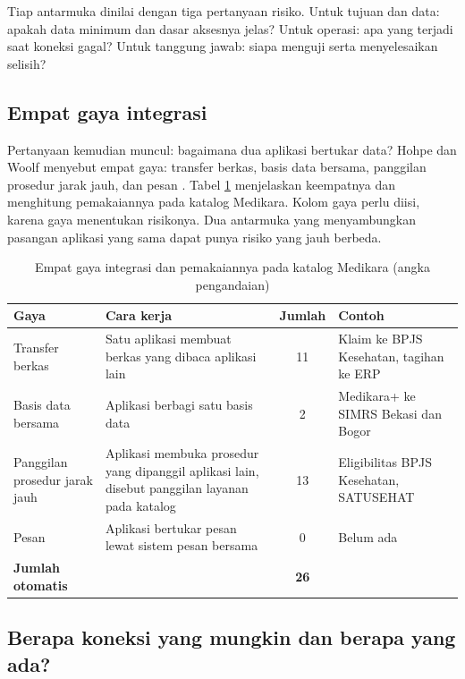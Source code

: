 Tiap antarmuka dinilai dengan tiga pertanyaan risiko. Untuk tujuan dan data: apakah data minimum dan dasar
aksesnya jelas? Untuk operasi: apa yang terjadi saat koneksi gagal? Untuk tanggung jawab: siapa menguji serta
menyelesaikan selisih?

\subsection*{Empat gaya integrasi}

Pertanyaan kemudian muncul: bagaimana dua aplikasi bertukar data? Hohpe dan Woolf menyebut empat gaya:
transfer berkas, basis data bersama, panggilan prosedur jarak jauh, dan pesan \cite{hohpe2003}. Tabel
\ref{tab:ch07-gaya} menjelaskan keempatnya dan menghitung pemakaiannya pada katalog Medikara. Kolom gaya
perlu diisi, karena gaya menentukan risikonya. Dua antarmuka yang menyambungkan pasangan aplikasi yang
sama dapat punya risiko yang jauh berbeda.

\begin{table}[!htb]
  \centering
  \caption{Empat gaya integrasi dan pemakaiannya pada katalog Medikara (angka pengandaian)}
  \label{tab:ch07-gaya}
  \small
  \begin{tabularx}{\textwidth}{>{\raggedright\arraybackslash}p{2.5cm}>{\raggedright\arraybackslash}Xc>{\raggedright\arraybackslash}p{3.2cm}}
    \hline
    \textbf{Gaya} & \textbf{Cara kerja} & \textbf{Jumlah} & \textbf{Contoh} \\
    \hline
    Transfer berkas & Satu aplikasi membuat berkas yang dibaca aplikasi lain & 11 & Klaim ke BPJS Kesehatan, tagihan ke ERP \\
    \hline
    Basis data bersama & Aplikasi berbagi satu basis data & 2 & Medikara+ ke SIMRS Bekasi dan Bogor \\
    \hline
    Panggilan prosedur jarak jauh & Aplikasi membuka prosedur yang dipanggil aplikasi lain, disebut panggilan layanan pada katalog & 13 & Eligibilitas BPJS Kesehatan, SATUSEHAT \\
    \hline
    Pesan & Aplikasi bertukar pesan lewat sistem pesan bersama & 0 & Belum ada \\
    \hline
    \textbf{Jumlah otomatis} & & \textbf{26} & \\
    \hline
  \end{tabularx}
\end{table}

\subsection*{Berapa koneksi yang mungkin dan berapa yang ada?}

